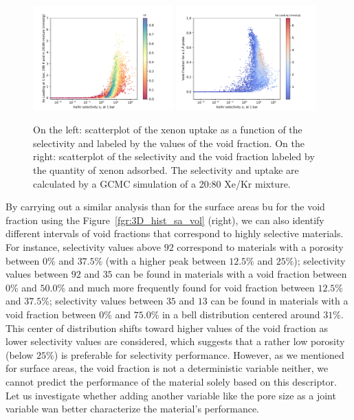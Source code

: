 \documentclass[main.tex]{subfiles}
\begin{document}
\begin{figure}[ht]
  \centering
  \includegraphics[width=0.48\textwidth]{figures/2-thermo/Scatterplot_uptake_selectivity_vol.pdf}
  \includegraphics[width=0.48\textwidth]{figures/2-thermo/Scatterplot_vol_selectivity.pdf}
  \caption{On the left: scatterplot of the xenon uptake as a function of the selectivity and labeled by the values of the void fraction. On the right: scatterplot of the selectivity and the void fraction labeled by the quantity of xenon adsorbed. The selectivity and uptake are calculated by a GCMC simulation of a 20:80 Xe/Kr mixture.}\label{fgr:vol}
\end{figure}

By carrying out a similar analysis than for the surface areas bu for the void fraction using the Figure~\ref{fgr:3D_hist_sa_vol} (right), we can also identify different intervals of void fractions that correspond to highly selective materials. For instance, selectivity values above $92$ correspond to materials with a porosity between {$0$\%} and {$37.5$\%} (with a higher peak between {$12.5$\%} and {$25$\%}); selectivity values between $92$ and $35$ can be found in materials with a void fraction between {$0$\%} and {$50.0$\%} and much more frequently found for void fraction between {$12.5$\%} and {$37.5$\%}; selectivity values between $35$ and $13$ can be found in materials with a void fraction between {$0$\%} and {$75.0$\%} in a bell distribution centered around {$31$\%}. This center of distribution shifts toward higher values of the void fraction as lower selectivity values are considered, which suggests that a rather low porosity (below {$25$\%}) is preferable for selectivity performance. However, as we mentioned for surface areas, the void fraction is not a deterministic variable neither, we cannot predict the performance of the material solely based on this descriptor. Let us investigate whether adding another variable like the pore size as a joint variable wan better characterize the material's performance. 
\end{document}

